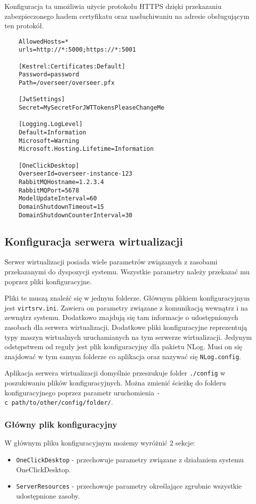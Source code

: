 \documentclass[../opis-rozwiazania.tex]{subfiles}
\begin{document}
Konfiguracja ta umożliwia użycie protokołu HTTPS dzięki przekazaniu zabezpieczonego hasłem certyfikatu oraz nasłuchiwaniu na adresie obsługującym ten protokół.

\begin{verbatim}
	AllowedHosts=*
	urls=http://*:5000;https://*:5001

	[Kestrel:Certificates:Default]
	Password=password
	Path=/overseer/overseer.pfx

	[JwtSettings]
	Secret=MySecretForJWTTokensPleaseChangeMe

	[Logging.LogLevel]
	Default=Information
	Microsoft=Warning
	Microsoft.Hosting.Lifetime=Information

	[OneClickDesktop]
	OverseerId=overseer-instance-123
	RabbitMQHostname=1.2.3.4
	RabbitMQPort=5678
	ModelUpdateInterval=60
	DomainShutdownTimeout=15
	DomainShutdownCounterInterval=30
\end{verbatim}

\subsection{Konfiguracja serwera wirtualizacji}
\label{system_startup.virtsrv_conf}
Serwer wirtualizacji posiada wiele parametrów związanych z zasobami przekazanymi do dyspozycji systemu.
Wszystkie parametry należy przekazać mu poprzez pliki konfiguracyjne.

Pliki te muszą znaleźć się w jednym folderze.
Głównym plikiem konfiguracyjnym jest \texttt{virtsrv.ini}.
Zawiera on parametry związane z komunikacją wewnątrz i na zewnątrz systemu.
Dodatkowo znajdują się tam informacje o udostępnionych zasobach dla serwera wirtualizacji.
Dodatkowe pliki konfiguracyjne reprezentują typy maszyn wirtualnych uruchamianych na tym serwerze wirtualizacji.
Jedynym odstępstwem od reguły jest plik konfiguracyjny dla pakietu NLog.
Musi on się znajdować w tym samym folderze co aplikacja oraz nazywać się \texttt{NLog.config}.

Aplikacja serwera wirtualizacji domyślnie przeszukuje folder \texttt{./config} w poszukiwaniu plików konfiguracyjnych.
Można zmienić ścieżkę do folderu konfiguracyjnego poprzez parametr uruchomienia \texttt{-c\ path/to/other/config/folder/}.

\subsubsection{Główny plik konfiguracyjny}
W głównym pliku konfiguracyjnym możemy wyróżnić 2 sekcje:
\begin{itemize}
	\item \texttt{OneClickDesktop} - przechowuje parametry związane z działaniem systemu OneClickDesktop.
	\item \texttt{ServerResources} - przechowuje parametry określające zgrubnie wszystkie udostępnione zasoby.
\end{itemize}
\end{document}
